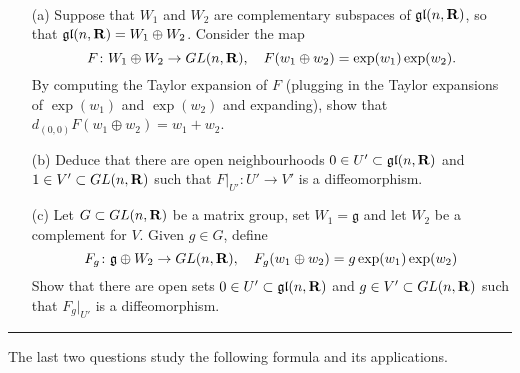 \documentclass[12pt]{article}
\begin{document}
\begin{question}\ \\
\begin{enumerate}
\item[(a)] Suppose that $W_1$ and $W_2$ are complementary subspaces of $\mathfrak{gl}(n,\mathbf{R})$, so that $\mathfrak{gl}(n,\mathbf{R})=W_1\oplus W_2$. Consider the map
\[F\colon W_1\oplus W_2\to GL(n,\mathbf{R}),\quad F(w_1\oplus w_2)=\exp(w_1)\exp(w_2).\]
By computing the Taylor expansion of $F$ (plugging in the Taylor expansions of $\exp(w_1)$ and $\exp(w_2)$ and expanding), show that $d_{(0,0)}F(w_1\oplus w_2)=w_1+w_2$.
\item[(b)] Deduce that there are open neighbourhoods $0\in U'\subset\mathfrak{gl}(n,\mathbf{R})$ and $1\in V'\subset GL(n,\mathbf{R})$ such that $F|_{U'}\colon U'\to V'$ is a diffeomorphism.
\item[(c)] Let $G\subset GL(n,\mathbf{R})$ be a matrix group, set $W_1=\mathfrak{g}$ and let $W_2$ be a complement for $V$. Given $g\in G$, define
\[F_g\colon\mathfrak{g}\oplus W_2\to GL(n,\mathbf{R}),\quad F_g(w_1\oplus w_2)=g\exp(w_1)\exp(w_2)\]
Show that there are open sets $0\in U'\subset\mathfrak{gl}(n,\mathbf{R})$ and $g\in V'\subset GL(n,\mathbf{R})$ such that $F_g|_{U'}$ is a diffeomorphism.
\end{enumerate}
\end{question}

\iffalse
\begin{answer}
\begin{enumerate}[(a)]
\item We have $F(w_1\oplus w_2)=(1+w_1+\cdots)(1+w_2+\cdots)=1+w_1+w_2+\cdots$ so the first order term in the Taylor expansion is $w_1+w_2$ (i.e. the differential $d_{(0,0)}F(w_1\oplus w_2)=w_1+w_2$ is the identity).
\item Since the differential is the identity and in particular invertible, the inverse function theorem guarantees the existence of a local smooth inverse for $F$ restricted to a sufficiently small neighbourhood of $0\in W_1\oplus W_2$.
\item In this case the differential is $d_{(0,0)}F_g(w_1\oplus w_2)=gw_1+gw_2$ in other words it is multiplication by $g\in GL(n,\RR)$ which is invertible so the inverse function theorem guarantees that $F_g$ is a local diffeomorphism. This provides exponential charts near every point $g\in G$.
\end{enumerate}
\end{answer}
\fi
\newpage

\bigskip
\hrule
\bigskip
The last two questions study the following formula and its applications.
\end{document}
